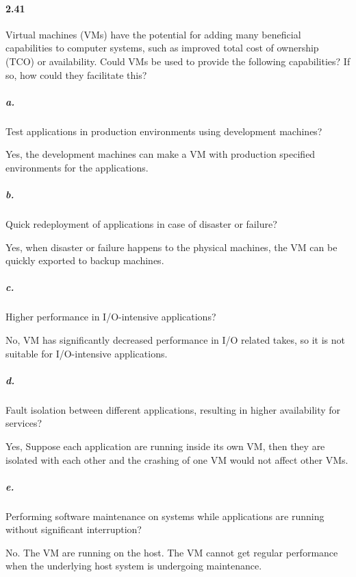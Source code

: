 \documentclass{article}
\begin{document}
\paragraph{2.41} Virtual machines (VMs) have the potential for adding many beneficial capabilities to computer systems, such as improved total cost of ownership (TCO) or availability. Could VMs be used to provide the following capabilities? If so, how could they facilitate this?

\subparagraph{a.} Test applications in production environments using development machines?

Yes, the development machines can make a VM with production specified environments for the applications.

\subparagraph{b.} Quick redeployment of applications in case of disaster or failure?

Yes, when disaster or failure happens to the physical machines, the VM can be quickly exported to backup machines.

\subparagraph{c.} Higher performance in I/O-intensive applications?

No, VM has significantly decreased performance in I/O related takes, so it is not suitable for I/O-intensive applications.

\subparagraph{d.} Fault isolation between different applications, resulting in higher availability for services?

Yes, Suppose each application are running inside its own VM, then they are isolated with each other and the crashing of one VM would not affect other VMs.

\subparagraph{e.} Performing software maintenance on systems while applications are running without significant interruption?

No. The VM are running on the host. The VM cannot get regular performance when the underlying host system is undergoing maintenance.
\end{document}
